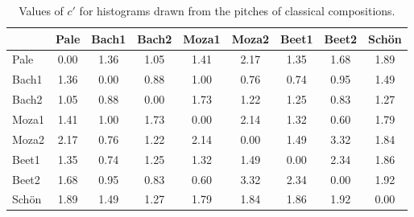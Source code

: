 \begin{table}[h!]
\begin{center}
\begin{tabular}{| l | c | c | c | c | c | c | c | c |}\hline
 & Pale & Bach1 & Bach2 & Moza1 & Moza2 & Beet1 & Beet2 & Sch\"on \\\hline
Pale & 0.00  & 1.36  & 1.05  & 1.41  & 2.17  & 1.35  & 1.68  & 1.89 \\\hline
Bach1 & 1.36  & 0.00  & 0.88  & 1.00  & 0.76  & 0.74  & 0.95  & 1.49 \\\hline
Bach2 & 1.05  & 0.88  & 0.00  & 1.73  & 1.22  & 1.25  & 0.83  & 1.27 \\\hline
Moza1 & 1.41  & 1.00  & 1.73  & 0.00  & 2.14  & 1.32  & 0.60  & 1.79 \\\hline
Moza2 & 2.17  & 0.76  & 1.22  & 2.14  & 0.00  & 1.49  & 3.32  & 1.84 \\\hline
Beet1 & 1.35  & 0.74  & 1.25  & 1.32  & 1.49  & 0.00  & 2.34  & 1.86 \\\hline
Beet2 & 1.68  & 0.95  & 0.83  & 0.60  & 3.32  & 2.34  & 0.00  & 1.92 \\\hline
Sch\"on & 1.89  & 1.49  & 1.27  & 1.79  & 1.84  & 1.86  & 1.92  & 0.00 \\\hline
\end{tabular}
\caption{Values of $c'$ for histograms drawn from the pitches of classical compositions.}
\end{center}
\end{table}